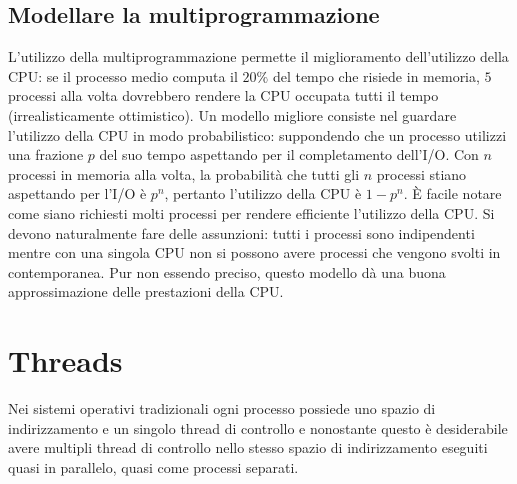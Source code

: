\subsection{Modellare la multiprogrammazione}
L'utilizzo della multiprogrammazione permette il miglioramento dell'utilizzo della CPU: se il processo medio computa il $20\%$ del tempo che risiede in memoria, $5$ processi alla volta
dovrebbero rendere la CPU occupata tutti il tempo (irrealisticamente ottimistico). Un modello migliore consiste nel guardare l'utilizzo della CPU in modo probabilistico: suppondendo che
un processo utilizzi una frazione $p$ del suo tempo aspettando per il completamento dell'I/O. Con $n$ processi in memoria alla volta, la probabilit\`a che tutti gli $n$ processi stiano
aspettando per l'I/O \`e $p^n$, pertanto l'utilizzo della CPU \`e $1-p^n$. \`E facile notare come siano richiesti molti processi per rendere efficiente l'utilizzo della CPU. Si devono
naturalmente fare delle assunzioni: tutti i processi sono indipendenti mentre con una singola CPU non si possono avere processi che vengono svolti in contemporanea. Pur non essendo 
preciso, questo modello d\`a una buona approssimazione delle prestazioni della CPU. 
\section{Threads}
Nei sistemi operativi tradizionali ogni processo possiede uno spazio di indirizzamento e un singolo thread di controllo e nonostante questo \`e desiderabile avere multipli thread di 
controllo nello stesso spazio di indirizzamento eseguiti quasi in parallelo, quasi come processi separati.
